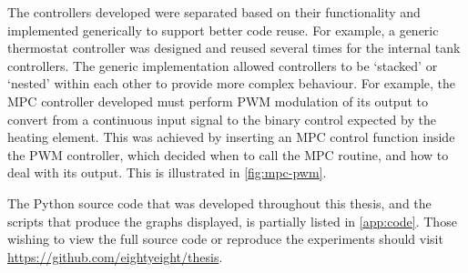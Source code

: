 The controllers developed were separated based on their functionality and implemented generically to support better code reuse.
For example, a generic thermostat controller was designed and reused several times for the internal tank controllers.
The generic implementation allowed controllers to be `stacked' or `nested' within each other to provide more complex behaviour.
For example, the MPC controller developed must perform PWM modulation of its output to convert from a continuous input signal to the binary control expected by the heating element.
This was achieved by inserting an MPC control function inside the PWM controller, which decided when to call the MPC routine, and how to deal with its output.
This is illustrated in \autoref{fig:mpc-pwm}.

The Python source code that was developed throughout this thesis, and the scripts that produce the graphs displayed, is partially listed in \autoref{app:code}.
Those wishing to view the full source code or reproduce the experiments should visit \url{https://github.com/eightyeight/thesis}.
